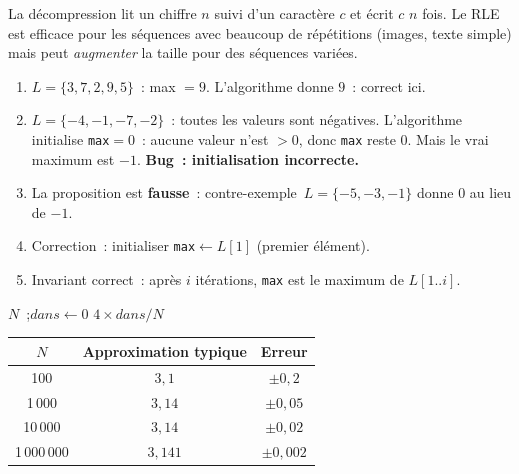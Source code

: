 La d\'ecompression lit un chiffre $n$ suivi d'un caract\`ere $c$ et \'ecrit $c$ $n$ fois.
Le RLE est efficace pour les s\'equences avec beaucoup de r\'ep\'etitions (images, texte simple)
mais peut \emph{augmenter} la taille pour des s\'equences vari\'ees.


\begin{enumerate}
  \item $L=\{3,7,2,9,5\}$~: max $=9$. L'algorithme donne $9$~: correct ici.
  \item $L=\{-4,-1,-7,-2\}$~: toutes les valeurs sont n\'egatives.
        L'algorithme initialise \texttt{max}$=0$~: aucune valeur n'est $>0$,
        donc \texttt{max} reste $0$. Mais le vrai maximum est $-1$.
        \textbf{Bug~: initialisation incorrecte.}
  \item La proposition est \textbf{fausse}~: contre-exemple~$L=\{-5,-3,-1\}$
        donne $0$ au lieu de $-1$.
  \item Correction~: initialiser \texttt{max}$\leftarrow L[1]$ (premier \'el\'ement).
  \item Invariant correct~: \og apr\`es $i$ it\'erations, \texttt{max}
        est le maximum de $L[1..i]$\fg.
\end{enumerate}


\begin{algorithm}[H]
\caption{Monte-Carlo pour $\pi$}
\Lire $N$~;\quad $\mathit{dans} \leftarrow 0$\;
\Afficher $4 \times \mathit{dans}/N$\;
\end{algorithm}

\begin{center}
\renewcommand{\arraystretch}{1.2}
\begin{tabular}{ccc}
\toprule
$N$ & Approximation typique & Erreur \\
\midrule
100 & $3{,}1$ & $\pm0{,}2$ \\
1\,000 & $3{,}14$ & $\pm0{,}05$ \\
10\,000 & $3{,}14$ & $\pm0{,}02$ \\
1\,000\,000 & $3{,}141$ & $\pm0{,}002$ \\
\bottomrule
\end{tabular}
\end{center}


